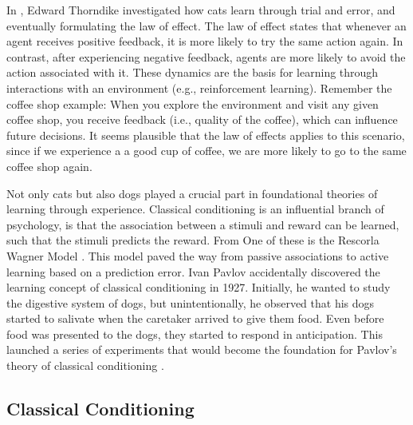 In \citeyear{thorndike1927law}, Edward Thorndike investigated how cats learn through trial and error, and eventually formulating the law of effect.
The law of effect states that whenever an agent receives positive feedback, it is more likely to try the same action again. In contrast, after experiencing negative feedback, agents are more likely to avoid the action associated with it.
These dynamics are the basis for learning through interactions with an environment (e.g., reinforcement learning). Remember the coffee shop example: When you explore the environment and visit any given coffee shop, you receive feedback (i.e., quality of the coffee), which can influence future decisions. It seems plausible that the law of effects applies to this scenario, since if we experience a a good cup of coffee, we are more likely to go to the same coffee shop again. 

Not only cats but also dogs played a crucial part in foundational theories of learning through experience. 
Classical conditioning is an influential branch of psychology,  is that the association between a stimuli and reward can be learned, such that the stimuli predicts the reward. %
From One of these is the Rescorla Wagner Model \citep{rescorla1972theory}. This model paved the way from passive associations to active learning based on a prediction error.
Ivan Pavlov accidentally discovered the learning concept of classical conditioning in 1927. Initially, he wanted to study the digestive system of dogs, but unintentionally, he observed that his dogs started to salivate when the caretaker arrived to give them food. Even before food was presented to the dogs, they started to respond in anticipation. This launched a series of experiments that would become the foundation for Pavlov's theory of classical conditioning \citep{pavlov1927conditional}.  


\subsection{Classical Conditioning}


